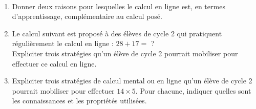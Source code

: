 \begin{exercice}[CRPE 2018 G1]
\ \\ [-10mm]
\begin{enumerate}
   \item Donner deux raisons pour lesquelles le calcul en ligne est, en termes d’apprentissage, complémentaire au calcul posé.
   \item Le calcul suivant est proposé à des élèves de cycle 2 qui pratiquent régulièrement le calcul en ligne : $28+17=$ ? \\
   Expliciter trois stratégies qu’un élève de cycle 2 pourrait mobiliser pour effectuer ce calcul en ligne.
   \item Expliciter trois stratégies de calcul mental ou en ligne qu’un élève de cycle 2 pourrait mobiliser pour effectuer $14\times5$. Pour chacune, indiquer quelles sont les connaissances et les propriétés utilisées.
\end{enumerate}
\end{exercice}


